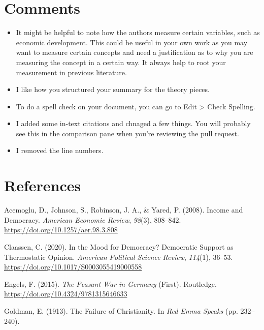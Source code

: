 \documentclass[
  english,
  man]{apa6}
\begin{document}
\hypertarget{comments}{%
\section{Comments}\label{comments}}

\begin{itemize}
\item
  It might be helpful to note how the authors measure certain variables, such as economic development. This could be useful in your own work as you may want to measure certain concepts and need a justification as to why you are measuring the concept in a certain way. It always help to root your measurement in previous literature.
\item
  I like how you structured your summary for the theory pieces.
\item
  To do a spell check on your document, you can go to Edit \textgreater{} Check Spelling.
\item
  I added some in-text citations and chnaged a few things. You will probably see this in the comparison pane when you're reviewing the pull request.
\item
  I removed the line numbers.
\end{itemize}

\newpage

\hypertarget{references}{%
\section{References}\label{references}}

\begingroup
\setlength{\parindent}{-0.5in}
\setlength{\leftskip}{0.5in}

\hypertarget{refs}{}
\leavevmode\hypertarget{ref-acemogluIncomeDemocracy2008}{}%
Acemoglu, D., Johnson, S., Robinson, J. A., \& Yared, P. (2008). Income and Democracy. \emph{American Economic Review}, \emph{98}(3), 808--842. \url{https://doi.org/10.1257/aer.98.3.808}

\leavevmode\hypertarget{ref-claassenMoodDemocracyDemocratic2020}{}%
Claassen, C. (2020). In the Mood for Democracy? Democratic Support as Thermostatic Opinion. \emph{American Political Science Review}, \emph{114}(1), 36--53. \url{https://doi.org/10.1017/S0003055419000558}

\leavevmode\hypertarget{ref-engelsPeasantWarGermany2015}{}%
Engels, F. (2015). \emph{The Peasant War in Germany} (First). Routledge. \url{https://doi.org/10.4324/9781315646633}

\leavevmode\hypertarget{ref-goldmanFailureChristianity1913}{}%
Goldman, E. (1913). The Failure of Christianity. In \emph{Red Emma Speaks} (pp. 232--240).
\end{document}

